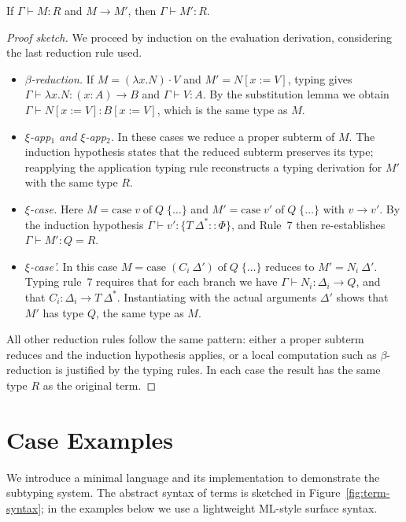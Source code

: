 \documentclass[a4paper, anonymous, UKenglish,cleveref, autoref, thm-restate]{lipics-v2021}
\begin{document}
\begin{theorem}[Preservation]
If $\Gamma \vdash M : R$ and $M \longrightarrow M'$, then $\Gamma \vdash M' : R$.
\end{theorem}
\begin{proof}[Proof sketch]
We proceed by induction on the evaluation derivation, considering the last reduction rule used.
\begin{itemize}
\item \emph{$\beta$-reduction.} If $M = (\lambda x. N) \cdot V$ and $M' = N[x := V]$, typing gives $\Gamma \vdash \lambda x. N : (x : A) \rightarrow B$ and $\Gamma \vdash V : A$. By the substitution lemma we obtain $\Gamma \vdash N[x := V] : B[x := V]$, which is the same type as $M$.
\item \emph{$\xi$-app$_1$ and $\xi$-app$_2$.} In these cases we reduce a proper subterm of $M$. The induction hypothesis states that the reduced subterm preserves its type; reapplying the application typing rule reconstructs a typing derivation for $M'$ with the same type $R$.
\item \emph{$\xi$-case.} Here $M = \text{case}\;v\;\text{of}\;Q\;\{\dots\}$ and $M' = \text{case}\;v'\;\text{of}\;Q\;\{\dots\}$ with $v \longrightarrow v'$. By the induction hypothesis $\Gamma \vdash v' : \{T\:\Delta^{*} :: \Phi\}$, and Rule~7 then re-establishes $\Gamma \vdash M' : Q = R$.
\item \emph{$\xi$-case'.} In this case $M = \text{case}\;(C_i\:\Delta')\;\text{of}\;Q\;\{\dots\}$ reduces to $M' = N_i\:\Delta'$. Typing rule~7 requires that for each branch we have $\Gamma \vdash N_i : \Delta_i \rightarrow Q$, and that $C_i : \Delta_i \rightarrow T\:\Delta^*$. Instantiating with the actual arguments $\Delta'$ shows that $M'$ has type $Q$, the same type as $M$.
\end{itemize}
All other reduction rules follow the same pattern: either a proper subterm reduces and the induction hypothesis applies, or a local computation such as $\beta$-reduction is justified by the typing rules. In each case the result has the same type $R$ as the original term.
\end{proof}

\section{Case Examples}
\label{sec:cases}
We introduce a minimal language and its implementation to demonstrate the subtyping system. The abstract syntax of terms is sketched in Figure~\ref{fig:term-syntax}; in the examples below we use a lightweight ML-style surface syntax.
	
\end{document}
